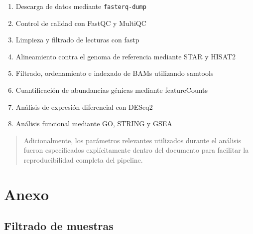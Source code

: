 \documentclass[
  12pt,
  letterpaper,
  DIV=11,
  numbers=noendperiod]{scrartcl}
\providecommand{\tightlist}{%
  \setlength{\itemsep}{0pt}\setlength{\parskip}{0pt}}
\begin{document}
\begin{enumerate}
\def\labelenumi{\arabic{enumi}.}
\tightlist
\item
  Descarga de datos mediante \texttt{fasterq-dump}
\item
  Control de calidad con FastQC y MultiQC
\item
  Limpieza y filtrado de lecturas con fastp
\item
  Alineamiento contra el genoma de referencia mediante STAR y HISAT2
\item
  Filtrado, ordenamiento e indexado de BAMs utilizando samtools
\item
  Cuantificación de abundancias génicas mediante featureCounts
\item
  Análisis de expresión diferencial con DESeq2
\item
  Análisis funcional mediante GO, STRING y GSEA
\end{enumerate}

\begin{quote}
Adicionalmente, los parámetros relevantes utilizados durante el análisis
fueron especificados explícitamente dentro del documento para facilitar
la reproducibilidad completa del pipeline.
\end{quote}

\newpage

\section{Anexo}\label{anexo}

\subsection{Filtrado de muestras}\label{filtrado-de-muestras-1}

\begin{table}[H]

\caption{\label{tbl-young-samples}Tabla de muestras del grupo de edad
joven (5-8 años) antes de la selección final. Se muestran las 10
muestras filtradas, ordenadas por edad y con información relevante para
la selección final.}


\end{table}%
\end{document}
